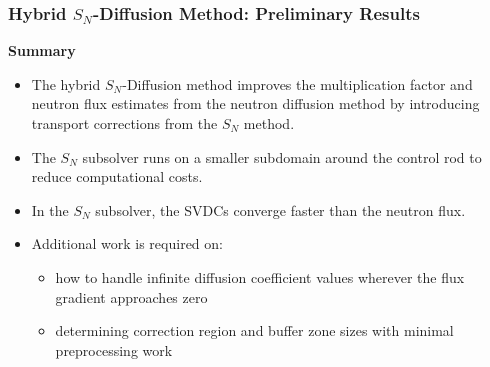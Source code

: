 \begin{frame}
  \frametitle{Hybrid $S_N$-Diffusion Method: Preliminary Results}
  \begin{block}{\textbf{Summary}}
    \begin{itemize}
      \item The hybrid $S_N$-Diffusion method improves the multiplication factor and neutron flux
        estimates from the neutron diffusion method by introducing transport corrections from the
        $S_N$ method.
      \item The $S_N$ subsolver runs on a smaller subdomain around the control rod to reduce
        computational costs.
      \item In the $S_N$ subsolver, the SVDCs converge faster than the neutron flux.
      \item Additional work is required on:
        \begin{itemize}
          \item how to handle infinite diffusion coefficient values wherever the flux gradient
            approaches zero
          \item determining correction region and buffer zone sizes with minimal preprocessing work
        \end{itemize}
    \end{itemize}
  \end{block}
\end{frame}
